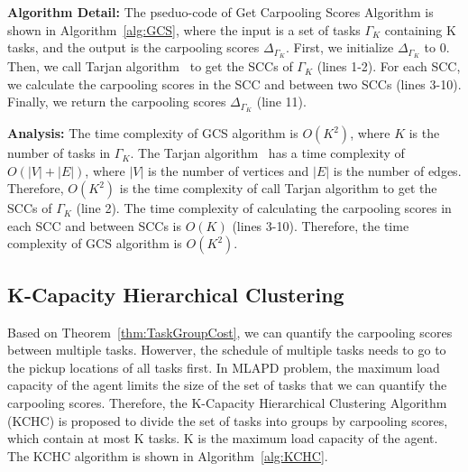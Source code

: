 \documentclass[sigconf,anonymous]{aamas}
\begin{document}
\textbf{Algorithm Detail:} 
The pseduo-code of Get Carpooling Scores Algorithm is shown in Algorithm~\ref{alg:GCS},
where the input is a set of tasks $\Gamma_K$ containing K tasks,
and the output is the carpooling scores $\Delta_{\Gamma_K}$.
First, we initialize $\Delta_{\Gamma_K}$ to 0.
Then, we call Tarjan algorithm~\cite{tarjan1972depth} to get the SCCs of $\Gamma_K$ (lines 1-2).
For each SCC, we calculate the carpooling scores in the SCC and between two SCCs (lines 3-10).
Finally, we return the carpooling scores $\Delta_{\Gamma_K}$ (line 11).

\textbf{Analysis:}
The time complexity of GCS algorithm is $O(K^2)$,
where $K$ is the number of tasks in $\Gamma_K$.
The Tarjan algorithm~\cite{tarjan1972depth} has a time complexity of $O(|V|+|E|)$,
where $|V|$ is the number of vertices and $|E|$ is the number of edges.
Therefore, $O(K^2)$ is the time complexity of call Tarjan algorithm to get the SCCs of $\Gamma_K$ (line 2).
The time complexity of calculating the carpooling scores in each SCC and between SCCs is $O(K)$ (lines 3-10).
Therefore, the time complexity of GCS algorithm is $O(K^2)$.

\subsection{K-Capacity Hierarchical Clustering}
Based on Theorem~\ref{thm:TaskGroupCost},
we can quantify the carpooling scores between multiple tasks.
Howerver, the schedule of multiple tasks needs to go to the pickup locations of all tasks first.
In MLAPD problem, the maximum load capacity of the agent limits 
the size of the set of tasks that we can quantify the carpooling scores.
Therefore, the K-Capacity Hierarchical Clustering Algorithm (KCHC)
is proposed to divide the set of tasks into groups by carpooling scores,
which contain at most K tasks.
K is the maximum load capacity of the agent.
The KCHC algorithm is shown in Algorithm~\ref{alg:KCHC}.
\end{document}
